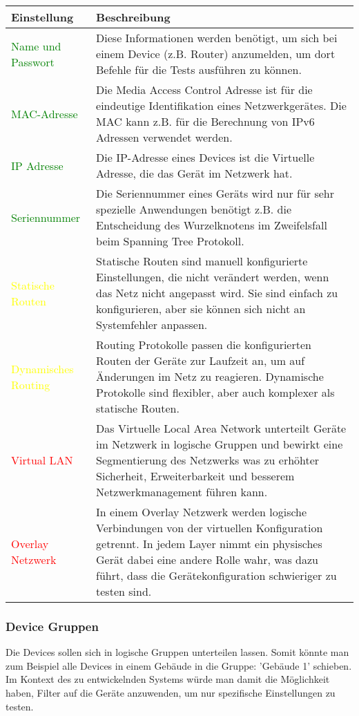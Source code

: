 \documentclass[
	ngerman,
	toc=listof, %
	toc=bibliography, %
	footnotes=multiple, %
	parskip=half, %
	numbers=noendperiod %
]{scrartcl}
\begin{document}
			\begin{tabularx}{\textwidth}{lX}
				\toprule
				Einstellung & Beschreibung\\
				\midrule
				\textcolor{green}{Name und Passwort} & Diese Informationen werden benötigt, um sich bei einem Device (z.B. Router) anzumelden, um dort Befehle für die Tests ausführen zu können. \\	
				\textcolor{green}{MAC-Adresse} & Die Media Access Control Adresse ist für die eindeutige Identifikation eines Netzwerkgerätes. Die MAC kann z.B. für die Berechnung von IPv6 Adressen verwendet werden.\\
				\textcolor{green}{IP Adresse} & Die IP-Adresse eines Devices ist die Virtuelle Adresse, die das Gerät im Netzwerk hat. \\
				\textcolor{green}{Seriennummer} & Die Seriennummer eines Geräts wird nur für sehr spezielle Anwendungen benötigt z.B. die Entscheidung des Wurzelknotens im Zweifelsfall beim Spanning Tree Protokoll. \\
				\midrule
				\textcolor{yellow}{Statische Routen} & Statische Routen sind manuell konfigurierte Einstellungen, die nicht verändert werden, wenn das Netz nicht angepasst wird. Sie sind einfach zu konfigurieren, aber sie können sich nicht an Systemfehler anpassen. \\
				\textcolor{yellow}{Dynamisches Routing} & Routing Protokolle passen die konfigurierten Routen der Geräte zur Laufzeit an, um auf Änderungen im Netz zu reagieren. Dynamische Protokolle sind flexibler, aber auch komplexer als statische Routen. \\
				\midrule
				\textcolor{red}{Virtual LAN} & Das Virtuelle Local Area Network unterteilt Geräte im Netzwerk in logische Gruppen und bewirkt eine Segmentierung des Netzwerks was zu erhöhter Sicherheit, Erweiterbarkeit und besserem Netzwerkmanagement führen kann. \\
				\textcolor{red}{Overlay Netzwerk} & In einem Overlay Netzwerk werden logische Verbindungen von der virtuellen Konfiguration getrennt. In jedem Layer nimmt ein physisches Gerät dabei eine andere Rolle wahr, was dazu führt, dass die Gerätekonfiguration schwieriger zu testen sind. \\				
				\bottomrule
			\end{tabularx}
			\newpage

		\subsubsection{Device Gruppen}
			Die Devices sollen sich in logische Gruppen unterteilen lassen. Somit könnte man zum Beispiel alle Devices in einem Gebäude in die Gruppe: 'Gebäude 1' schieben.
			Im Kontext des zu entwickelnden Systems würde man damit die Möglichkeit haben, Filter auf die Geräte anzuwenden, um nur spezifische Einstellungen zu testen.
\end{document}
